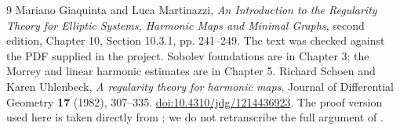 \documentclass[11pt,a4paper]{article}
\numberwithin{equation}{section}
\theoremstyle{definition}
\begin{document}
\begin{thebibliography}{9}
Mariano Giaquinta and Luca Martinazzi,
\emph{An Introduction to the Regularity Theory for Elliptic Systems, Harmonic Maps and Minimal Graphs},
second edition, Chapter 10, Section 10.3.1, pp. 241--249.
The text was checked against the PDF supplied in the project. Sobolev foundations are in Chapter 3; the Morrey and linear harmonic estimates are in Chapter 5.
Richard Schoen and Karen Uhlenbeck,
\emph{A regularity theory for harmonic maps},
Journal of Differential Geometry \textbf{17} (1982), 307--335.
\href{https://doi.org/10.4310/jdg/1214436923}{doi:10.4310/jdg/1214436923}.
The proof version used here is taken directly from \cite{GM}; we do not retranscribe the full argument of \cite{SU}.
\end{thebibliography}
\end{document}
